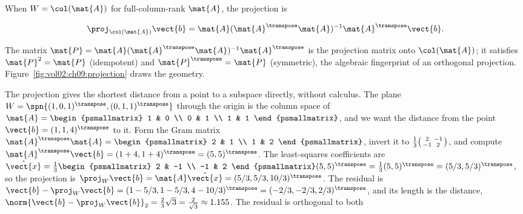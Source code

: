 When $W = \col(\mat{A})$ for full-column-rank $\mat{A}$, the
projection is

\[
\proj_{\col(\mat{A})}\vect{b} = \mat{A}(\mat{A}^{\transpose}\mat{A})^{-1}
\mat{A}^{\transpose}\vect{b}.
\]

The matrix $\mat{P} = \mat{A}(\mat{A}^{\transpose}\mat{A})^{-1}
\mat{A}^{\transpose}$ is the projection matrix onto $\col(\mat{A})$;
it satisfies $\mat{P}^{2} = \mat{P}$ (idempotent) and
$\mat{P}^{\transpose} = \mat{P}$ (symmetric), the algebraic
fingerprint of an orthogonal projection.
Figure~\ref{fig:vol02:ch09:projection} draws the geometry.



\begin{example}
The projection gives the shortest distance from a point to a subspace
directly, without calculus. The plane $W = \spn\{(1, 0, 1)^{\transpose},
(0, 1, 1)^{\transpose}\}$ through the origin is the column space of
$\mat{A} = \begin{psmallmatrix} 1 & 0 \\ 0 & 1 \\ 1 & 1
\end{psmallmatrix}$, and we want the distance from the point $\vect{b}
= (1, 1, 4)^{\transpose}$ to it. Form the Gram matrix
$\mat{A}^{\transpose}\mat{A} = \begin{psmallmatrix} 2 & 1 \\ 1 & 2
\end{psmallmatrix}$, invert it to $\tfrac{1}{3}\begin{psmallmatrix} 2 &
-1 \\ -1 & 2 \end{psmallmatrix}$, and compute $\mat{A}^{\transpose}
\vect{b} = (1 + 4, 1 + 4)^{\transpose} = (5, 5)^{\transpose}$. The
least-squares coefficients are $\hat{\vect{x}} = \tfrac{1}{3}
\begin{psmallmatrix} 2 & -1 \\ -1 & 2 \end{psmallmatrix}(5, 5)^{
\transpose} = \tfrac{1}{3}(5, 5)^{\transpose} = (5/3, 5/3)^{\transpose}$,
so the projection is $\proj_{W}\vect{b} = \mat{A}\hat{\vect{x}} =
(5/3, 5/3, 10/3)^{\transpose}$. The residual is $\vect{b} -
\proj_{W}\vect{b} = (1 - 5/3, 1 - 5/3, 4 - 10/3)^{\transpose} =
(-2/3, -2/3, 2/3)^{\transpose}$, and its length is the distance,
$\norm{\vect{b} - \proj_{W}\vect{b}}_{2} = \tfrac{2}{3}\sqrt{3} =
\tfrac{2}{\sqrt{3}} \approx 1.155$. The residual is orthogonal to both

\end{example}
